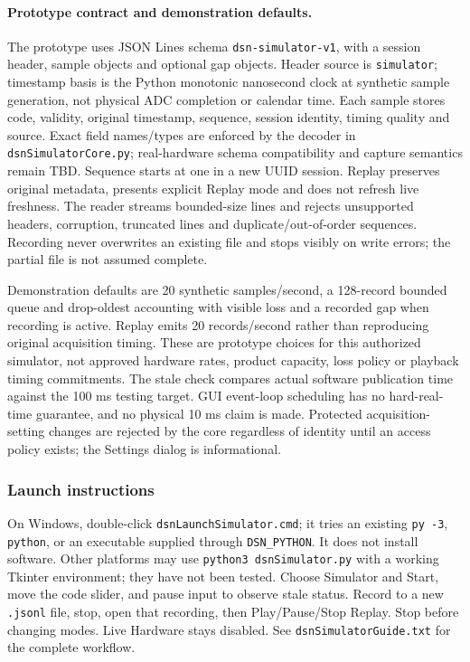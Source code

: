 \paragraph{Prototype contract and demonstration defaults.}
The prototype uses JSON Lines schema \texttt{dsn-simulator-v1}, with a session
header, sample objects and optional gap objects. Header source is
\texttt{simulator}; timestamp basis is the Python monotonic nanosecond clock
at synthetic sample generation, not physical ADC completion or calendar time.
Each sample stores code, validity, original timestamp, sequence, session
identity, timing quality and source. Exact field names/types are enforced by
the decoder in \texttt{dsnSimulatorCore.py}; real-hardware schema compatibility
and capture semantics remain TBD. Sequence starts at one in a new UUID session.
Replay preserves original metadata, presents explicit Replay mode and does not
refresh live freshness. The reader streams bounded-size lines and rejects
unsupported headers, corruption, truncated lines and duplicate/out-of-order
sequences. Recording never overwrites an existing file and stops visibly on
write errors; the partial file is not assumed complete.

Demonstration defaults are 20 synthetic samples/second, a 128-record bounded
queue and drop-oldest accounting with visible loss and a recorded gap when
recording is active. Replay emits 20 records/second rather than reproducing
original acquisition timing. These are prototype choices for this authorized
simulator, not approved hardware rates, product capacity, loss policy or
playback timing commitments. The stale check compares actual software
publication time against the 100 ms testing target. GUI event-loop scheduling
has no hard-real-time guarantee, and no physical 10 ms claim is made.
Protected acquisition-setting changes are rejected by the core regardless of
identity until an access policy exists; the Settings dialog is informational.

\subsubsection{Launch instructions}
On Windows, double-click \texttt{dsnLaunchSimulator.cmd}; it tries an existing
\texttt{py -3}, \texttt{python}, or an executable supplied through
\texttt{DSN\_PYTHON}. It does not install software. Other platforms may use
\texttt{python3 dsnSimulator.py} with a working Tkinter environment; they
have not been tested. Choose Simulator and Start, move the code slider, and
pause input to observe stale status. Record to a new \texttt{.jsonl} file,
stop, open that recording, then Play/Pause/Stop Replay. Stop before changing
modes. Live Hardware stays disabled. See \texttt{dsnSimulatorGuide.txt} for
the complete workflow.

